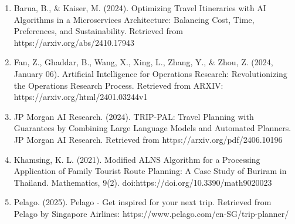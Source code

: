 \documentclass{ecai}
\begin{document}

\begin{enumerate}
    \item Barua, B., \& Kaiser, M. (2024). Optimizing Travel Itineraries with AI Algorithms in a Microservices Architecture: Balancing Cost, Time, Preferences, and Sustainability. Retrieved from https://arxiv.org/abs/2410.17943
    \item Fan, Z., Ghaddar, B., Wang, X., Xing, L., Zhang, Y., \& Zhou, Z. (2024, January 06). Artificial Intelligence for Operations Research: Revolutionizing the Operations Research Process. Retrieved from ARXIV: https://arxiv.org/html/2401.03244v1
    \item JP Morgan AI Research. (2024). TRIP-PAL: Travel Planning with Guarantees by Combining Large Language Models and Automated Planners. JP Morgan AI Research. Retrieved from https://arxiv.org/pdf/2406.10196
    \item Khamsing, K. L. (2021). Modified ALNS Algorithm for a Processing Application of Family Tourist Route Planning: A Case Study of Buriram in Thailand. Mathematics, 9(2). doi:https://doi.org/10.3390/math9020023
    \item Pelago. (2025). Pelago - Get inspired for your next trip. Retrieved from Pelago by Singapore Airlines: https://www.pelago.com/en-SG/trip-planner/
\end{enumerate}
\end{document}
